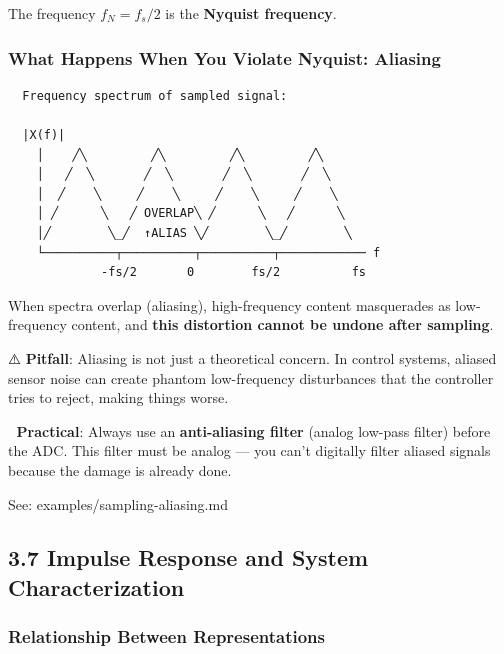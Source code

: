 \documentclass[11pt,a4paper]{book}
\begin{document}
The frequency $f_N = f_s / 2$ is the \textbf{Nyquist frequency}.

\subsubsection{What Happens When You Violate Nyquist: Aliasing}

\begin{lstlisting}
  Frequency spectrum of sampled signal:
  
  |X(f)|
    │    ╱╲         ╱╲         ╱╲         ╱╲
    │   ╱  ╲       ╱  ╲       ╱  ╲       ╱  ╲
    │  ╱    ╲     ╱    ╲     ╱    ╲     ╱    ╲
    │ ╱      ╲   ╱ OVERLAP╲ ╱      ╲   ╱      ╲
    │╱        ╲_╱  ↑ALIAS ╲╱        ╲_╱        ╲
    └──────────┬──────────┬──────────┬──────────── f
             -fs/2       0        fs/2          fs
\end{lstlisting}

When spectra overlap (aliasing), high-frequency content masquerades as low-frequency content, and \textbf{this distortion cannot be undone after sampling}.

⚠️ \textbf{Pitfall}: Aliasing is not just a theoretical concern. In control systems, aliased sensor noise can create phantom low-frequency disturbances that the controller tries to reject, making things worse.

🔧 \textbf{Practical}: Always use an \textbf{anti-aliasing filter} (analog low-pass filter) before the ADC. This filter must be analog — you can't digitally filter aliased signals because the damage is already done.

See: examples/sampling-aliasing.md

\medskip\noindent\hrulefill\medskip

\subsection{3.7 Impulse Response and System Characterization}

\subsubsection{Relationship Between Representations}

\end{document}
